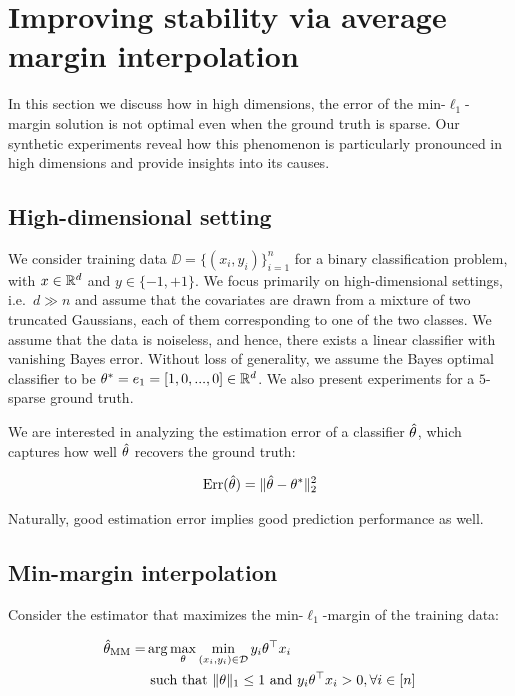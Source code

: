 \section{Improving stability via average margin interpolation}

In this section we discuss how in high dimensions, the error of the
min-$\ell_1$-margin solution is not optimal even when the ground truth is
sparse. Our synthetic experiments reveal how this phenomenon is particularly
pronounced in high dimensions and provide insights into its causes.


\subsection{High-dimensional setting}
\label{sec:setting}

We consider training data $\DD=\{(x_i, y_i)\}_{i=1}^{n}$ for a binary
classification problem, with $x\in \mathbb{R}^d$ and $y\in \{-1, +1\}$. We focus
primarily on high-dimensional settings, i.e.\ $d \gg n$ and assume that the
covariates are drawn from a mixture of two truncated Gaussians, each of them
corresponding to one of the two classes. We assume
that the data is noiseless, and hence, there exists a linear classifier with
vanishing Bayes error. Without loss of generality, we assume the Bayes optimal
classifier to be $\theta^*=e_1=[1, 0, ..., 0] \in \mathbb{R}^d$. We also present
experiments for a $5$-sparse ground truth.

We are interested in analyzing the estimation error of a classifier $\hat{\theta}$,
which captures how well $\hat{\theta}$ recovers the ground truth:

\begin{align}
\text{Err}(\hat{\theta}) = \|\hat{\theta} - \theta^*\|_2^2 
\end{align}

Naturally, good estimation error implies good prediction performance as well.


\subsection{Min-margin interpolation}

Consider the estimator that maximizes the min-$\ell_1$-margin of the training
data:

\begin{align}
  \hat{\theta}_{\mathrm{MM}} =& \arg\max_{\theta} \min_{(x_i, y_i) \in \mathcal{D}} y_i\theta^\top x_i \\
  &\text{ such that }
  \|\theta\|_1 \le 1 \text{ and } y_i\theta^\top x_i > 0, \forall i \in [n]
\end{align}

